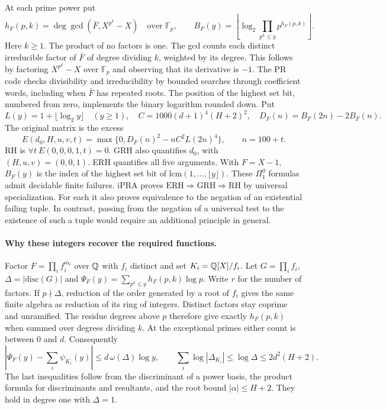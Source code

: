 At each prime power put
\[
 h_F(p,k)=\deg\gcd(\bar F,X^{p^k}-X)\quad \text{over }\mathbb F_p,\qquad
 B_F(y)=\left\lfloor\log_2 \prod_{p^k\le y}p^{h_F(p,k)}\right\rfloor .
\]
Here $k\ge1$. The product of no factors is one. The gcd counts each distinct irreducible factor of $\bar F$ of degree dividing $k$, weighted by its degree. This follows by factoring $X^{p^k}-X$ over $\mathbb F_p$ and observing that its derivative is $-1$. The PR code checks divisibility and irreducibility by bounded searches through coefficient words, including when $\bar F$ has repeated roots. The position of the highest set bit, numbered from zero, implements the binary logarithm rounded down. Put
\[
 L(y)=1+\lfloor\log_2 y\rfloor\quad(y\ge1),\quad C=1000(d+1)^4(H+2)^2,\quad
 D_F(n)=B_F(2n)-2B_F(n).
\]
The original matrix is the excess
\[
 E(d_0,H,u,v,t)=\max\{0,D_F(n)^2-nC^2L(2n)^4\},\qquad n=100+t.
\]
RH is $\forall t\ E(0,0,0,1,t)=0$. GRH also quantifies $d_0$, with $(H,u,v)=(0,0,1)$. ERH quantifies all five arguments. With $F=X-1$, $B_F(y)$ is the index of the highest set bit of $\mathrm{lcm}(1,\ldots,\lfloor y\rfloor)$. These $\Pi^0_1$ formulas admit decidable finite failures. iPRA proves $\mathrm{ERH}\Rightarrow\mathrm{GRH}\Rightarrow\mathrm{RH}$ by universal specialization. For each it also proves equivalence to the negation of an existential failing tuple. In contrast, passing from the negation of a universal test to the existence of such a tuple would require an additional principle in general.

\paragraph{Why these integers recover the required functions.}
Factor $F=\prod_i f_i^{m_i}$ over $\mathbb Q$ with $f_i$ distinct and set $K_i=\mathbb Q[X]/f_i$. Let $G=\prod_i f_i$, $\Delta=|\mathrm{disc}(G)|$ and
$\Psi_F(y)=\sum_{p^k\le y}h_F(p,k)\log p$. Write $r$ for the number of factors. If $p\nmid\Delta$, reduction of the order generated by a root of $f_i$ gives the same finite algebra as reduction of its ring of integers. Distinct factors stay coprime and unramified. The residue degrees above $p$ therefore give exactly $h_F(p,k)$ when summed over degrees dividing $k$. At the exceptional primes either count is between $0$ and $d$. Consequently
\[
 \left|\Psi_F(y)-\sum_i\psi_{K_i}(y)\right|
 \le d\,\omega(\Delta)\log y,\qquad
 \sum_i\log |\Delta_{K_i}|\le\log\Delta\le 2d^2(H+2).
\]
The last inequalities follow from the discriminant of a power basis, the product formula for discriminants and resultants, and the root bound $|\alpha|\le H+2$. They hold in degree one with $\Delta=1$.

